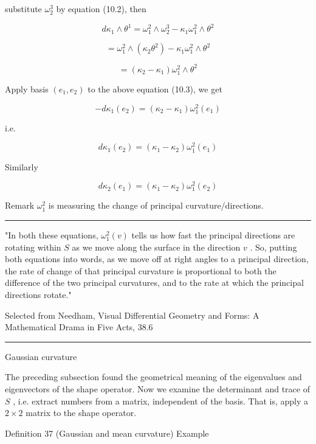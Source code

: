 \documentclass[lang=cn,a4paper,11pt,openany,twoside]{elegantbook}
\newcommand{\HRule}{\begin{center}\rule{0.9\linewidth}{0.2mm}\end{center}}
\begin{document}
substitute \({\omega }_{2}^{3}\) by equation (10.2), then

\[
d{\kappa }_{1} \land  {\theta }^{1} = {\omega }_{1}^{2} \land  {\omega }_{2}^{3} - {\kappa }_{1}{\omega }_{1}^{2} \land  {\theta }^{2}
\]

\[
= {\omega }_{1}^{2} \land  \left( {{\kappa }_{2}{\theta }^{2}}\right)  - {\kappa }_{1}{\omega }_{1}^{2} \land  {\theta }^{2} \tag{10.3}
\]

\[
= \left( {{\kappa }_{2} - {\kappa }_{1}}\right) {\omega }_{1}^{2} \land  {\theta }^{2}
\]

Apply basis \(\left( {{e}_{1},{e}_{2}}\right)\) to the above equation (10.3), we get

\[
- d{\kappa }_{1}\left( {e}_{2}\right)  = \left( {{\kappa }_{2} - {\kappa }_{1}}\right) {\omega }_{1}^{2}\left( {e}_{1}\right)
\]

i.e.

\[
d{\kappa }_{1}\left( {e}_{2}\right)  = \left( {{\kappa }_{1} - {\kappa }_{2}}\right) {\omega }_{1}^{2}\left( {e}_{1}\right)
\]

Similarly

\[
d{\kappa }_{2}\left( {e}_{1}\right)  = \left( {{\kappa }_{1} - {\kappa }_{2}}\right) {\omega }_{1}^{2}\left( {e}_{2}\right)
\]

Remark \({\omega }_{1}^{2}\) is measuring the change of principal curvature/directions.

\HRule

"In both these equations, \({\omega }_{1}^{2}\left( v\right)\) tells us how fast the principal directions are rotating within \(S\) as we move along the surface in the direction \(v\) . So, putting both equations into words, as we move off at right angles to a principal direction, the rate of change of that principal curvature is proportional to both the difference of the two principal curvatures, and to the rate at which the principal directions rotate."

Selected from Needham, Visual Differential Geometry and Forms: A Mathematical Drama in Five Acts, 38.6

\HRule

Gaussian curvature

The preceding subsection found the geometrical meaning of the eigenvalues and eigenvectors of the shape operator. Now we examine the determinant and trace of \(S\) , i.e. extract numbers from a matrix, independent of the basis. That is, apply a \(2 \times  2\) matrix to the shape operator.

Definition 37 (Gaussian and mean curvature) Example
\end{document}
